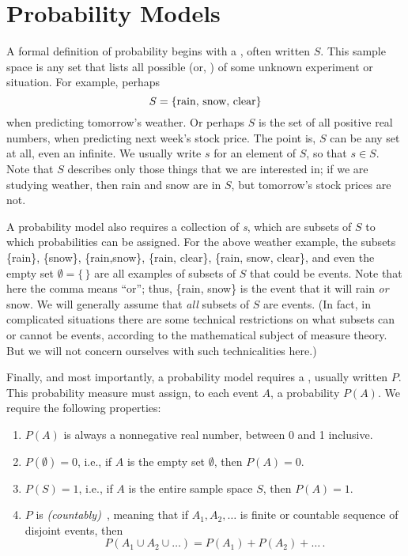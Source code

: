 \section{Probability Models}
A formal definition of probability begins with a , often written  $S$. This
sample space is any set that lists all possible  (or, )
of some unknown experiment or situation. For example, perhaps
\begin{equation}
    S =  \{\text{rain, snow, clear}\} \notag
\end{equation}
when predicting tomorrow's weather. Or perhaps $S$ is the set of all positive real numbers, when predicting next
week's stock price. The point is, $S$ can be any set at all, even an infinite. We usually write $s$ for an element of
$S$, so that $s \in S$. Note that $S$ describes only those things that we are interested in; if we are studying
weather, then rain and snow are in $S$, but tomorrow's stock prices are not.

A probability model also requires a collection of \emph{s}, which are subsets of $S$ to which
probabilities can be assigned. For the above weather example, the subsets \{rain\}, \{snow\}, \{rain,snow\}, \{rain,
clear\}, \{rain, snow, clear\}, and even the empty set $\emptyset = \{\,\}$ are all examples of subsets of $S$ that
could be events. Note that here the comma means ``or''; thus, \{rain, snow\} is the event that it will rain \emph{or}
snow. We will generally assume that \emph{all} subsets of $S$ are events. (In fact, in complicated situations there
are some technical restrictions on what subsets can or cannot be events, according to the mathematical subject of
measure theory. But we will not concern ourselves with such technicalities here.)

Finally, and most importantly, a probability model requires a ,
usually written $P$. This probability measure must assign, to each event $A$, a probability $P(A)$. We require the
following properties:
\begin{enumerate}
    \item $P(A)$ is always a nonnegative real number, between 0 and 1 inclusive.
    \item $P(\emptyset) = 0$, i.e., if $A$ is the empty set $\emptyset$, then $P(A)=0$.
    \item $P(S)=1$, i.e., if $A$ is the entire sample space $S$, then $P(A)=1$.
    \item $P$ is \emph{(countably)}~, meaning that if $A_1, A_2, \dots$ is
    finite or countable
    sequence of
    disjoint events, then
    \begin{equation}\label{eq:additive_rule}
        P(A_1 \cup A_2 \cup \ldots) = P(A_1) + P(A_2) + \ldots\,.
    \end{equation}
\end{enumerate}

